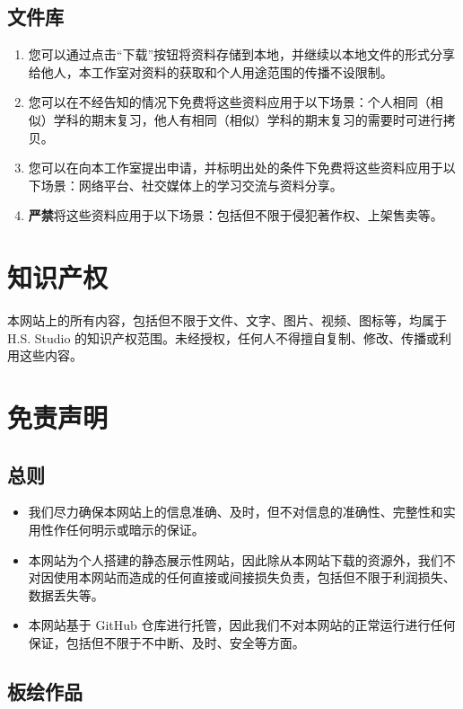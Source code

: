 \documentclass{article}
\begin{document}
\subsection*{文件库}

\begin{enumerate}
    \item 您可以通过点击“下载”按钮将资料存储到本地，并继续以本地文件的形式分享给他人，本工作室对资料的获取和个人用途范围的传播不设限制。
    \item 您可以在不经告知的情况下免费将这些资料应用于以下场景：个人相同（相似）学科的期末复习，他人有相同（相似）学科的期末复习的需要时可进行拷贝。
    \item 您可以在向本工作室提出申请，并标明出处的条件下免费将这些资料应用于以下场景：网络平台、社交媒体上的学习交流与资料分享。
    \item \textbf{严禁}将这些资料应用于以下场景：包括但不限于侵犯著作权、上架售卖等。
\end{enumerate}

\section{知识产权}

本网站上的所有内容，包括但不限于文件、文字、图片、视频、图标等，均属于 H.S. Studio 的知识产权范围。未经授权，任何人不得擅自复制、修改、传播或利用这些内容。

\section{免责声明}

\subsection*{总则}

\begin{itemize}
    \item 我们尽力确保本网站上的信息准确、及时，但不对信息的准确性、完整性和实用性作任何明示或暗示的保证。
    \item 本网站为个人搭建的静态展示性网站，因此除从本网站下载的资源外，我们不对因使用本网站而造成的任何直接或间接损失负责，包括但不限于利润损失、数据丢失等。
    \item 本网站基于 GitHub 仓库进行托管，因此我们不对本网站的正常运行进行任何保证，包括但不限于不中断、及时、安全等方面。
\end{itemize}

\subsection*{板绘作品}
\end{document}
